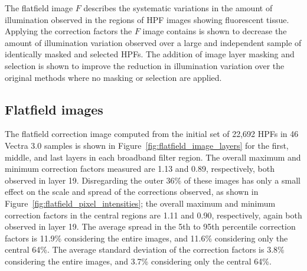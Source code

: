 \documentclass[letterpaper,11pt]{article}
\newcommand{\reffig}[1]{Figure~\ref{#1}}
\begin{document}
The flatfield image $F$ describes the systematic variations in the amount of illumination observed in the regions of HPF images showing fluorescent tissue. Applying the correction factors the $F$ image contains is shown to decrease the amount of illumination variation observed over a large and independent sample of identically masked and selected HPFs. The addition of image layer masking and selection is shown to improve the reduction in illumination variation over the original methods where no masking or selection are applied.

\subsection{Flatfield images}
\label{ssec:flatfield_images}

The flatfield correction image computed from the initial set of 22,692 HPFs in 46 Vectra 3.0 samples is shown in \reffig{fig:flatfield_image_layers} for the first, middle, and last layers in each broadband filter region. The overall maximum and minimum correction factors measured are 1.13 and 0.89, respectively, both observed in layer 19. Disregarding the outer 36\% of these images has only a small effect on the scale and spread of the corrections observed, as shown in \reffig{fig:flatfield_pixel_intensities}; the overall maximum and minimum correction factors in the central regions are 1.11 and 0.90, respectively, again both observed in layer 19. The average spread in the 5th to 95th percentile correction factors is 11.9\% considering the entire images, and 11.6\% considering only the central 64\%. The average standard deviation of the correction factors is 3.8\% considering the entire images, and 3.7\% considering only the central 64\%. 
\end{document}
